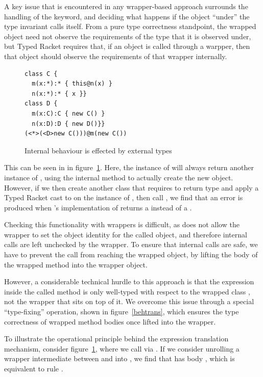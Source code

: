 \documentclass[a4paper,USenglish]{tex/lipics-v2016}
\begin{document}
A key issue that is encountered in any wrapper-based approach surrounds the 
handling of the \this keyword, and deciding what happens if the object ``under''
the type invariant calls itself. From a pure type correctness standpoint, 
the wrapped object need not observe the requirements of the type that it is
observed under, but Typed Racket requires that, if an object is called through a
warpper, then that object should observe the requirements of that wrapper 
internally.

\begin{figure}[!ht]
\begin{lstlisting}
class C { 
  m(x:*):* { this@n(x) }
  n(x:*):* { x }}
class D { 
  m(x:C):C { new C() }
  n(x:D):D { new D()}}
(<*>(<D>new C()))@m(new C())
\end{lstlisting}
\caption{Internal behaviour is effected by external types}
\label{fig:intbeh}
\end{figure}

This can be seen in in figure~\ref{fig:intbeh}. Here, the instance of \C will 
always return another instance of \C, using the internal method \n to actually
create the new object. However, if we then create another class \D that requires
\n to return type \D and apply a Typed Racket cast to \D on the instance of \C,
then call \m, we find that an error is produced when \C's implementation of \n
returns a \C instead of a \D.

Checking this functionality with wrappers is difficult, as \kafka does not allow
the wrapper to set the object identity for the called object, and therefore 
internal calls are left unchecked by the wrapper. To ensure that internal calls
are safe, we have to prevent the call from reaching the wrapped object, by 
lifting the body of the wrapped method into the wrapper object.

However, a considerable technical hurdle to this approach is that the expression
\e inside the called method is only well-typed with respect to the wrapped class
, not the wrapper that sits on top of it. We overcome this issue through a 
special ``type-fixing'' operation, shown in figure~\ref{behtrans}, which 
ensures the type correctness of wrapped method bodies once lifted into the 
wrapper.

To illustrate the operational principle behind the expression translation 
mechanism, consider figure~\ref{fig:intbeh}, where we call \n via \m. If we 
consider unrolling a wrapper intermediate between \m and \n into \m, we find 
that \m has body \BehCast\D{\Call\this\n{\BehCast\D\x}}, which is equivalent
to rule .
\end{document}
